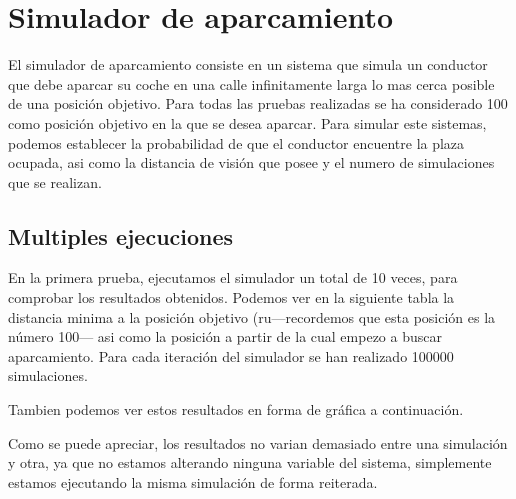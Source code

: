 \chapter{Simulador de aparcamiento}
El simulador de aparcamiento consiste en un sistema que simula un conductor que debe aparcar su coche en una calle infinitamente larga lo mas cerca posible de una posición objetivo. Para todas las pruebas realizadas se ha considerado 100 como posición objetivo en la que se desea aparcar. Para simular este sistemas, podemos establecer la probabilidad de que el conductor encuentre la plaza ocupada, asi como la distancia de visión que posee y el numero de simulaciones que se realizan.
\section{Multiples ejecuciones}
En la primera prueba, ejecutamos el simulador un total de 10 veces, para comprobar los resultados obtenidos. Podemos ver en la siguiente tabla la distancia minima a la posición objetivo (ru---recordemos que esta posición es la número 100--- asi como la posición a partir de la cual empezo a buscar aparcamiento. Para cada iteración del simulador se han realizado 100000 simulaciones.
\begin{table}[h]
\centering
{}
\end{table}

Tambien podemos ver estos resultados en forma de gráfica a continuación.

Como se puede apreciar, los resultados no varian demasiado entre una simulación y otra, ya que no estamos alterando ninguna variable del sistema, simplemente estamos ejecutando la misma simulación de forma reiterada.

